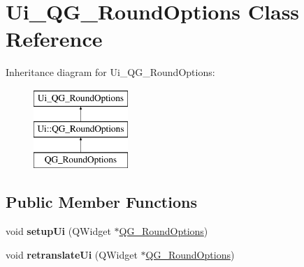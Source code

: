 \hypertarget{classUi__QG__RoundOptions}{\section{Ui\-\_\-\-Q\-G\-\_\-\-Round\-Options Class Reference}
\label{classUi__QG__RoundOptions}
}
Inheritance diagram for Ui\-\_\-\-Q\-G\-\_\-\-Round\-Options\-:\begin{figure}[H]
\begin{center}
\leavevmode
\includegraphics[height=3.000000cm]{classUi__QG__RoundOptions}
\end{center}
\end{figure}
\subsection*{Public Member Functions}
\begin{DoxyCompactItemize}
\item 
\hypertarget{classUi__QG__RoundOptions_ad0457e212c550ee25db760a10264d936}{void {\bfseries setup\-Ui} (Q\-Widget $\ast$\hyperlink{classQG__RoundOptions}{Q\-G\-\_\-\-Round\-Options})}\label{classUi__QG__RoundOptions_ad0457e212c550ee25db760a10264d936}

\item 
\hypertarget{classUi__QG__RoundOptions_adce2cef33a794e5139a47e3e9c919f58}{void {\bfseries retranslate\-Ui} (Q\-Widget $\ast$\hyperlink{classQG__RoundOptions}{Q\-G\-\_\-\-Round\-Options})}\label{classUi__QG__RoundOptions_adce2cef33a794e5139a47e3e9c919f58}

\end{DoxyCompactItemize}
